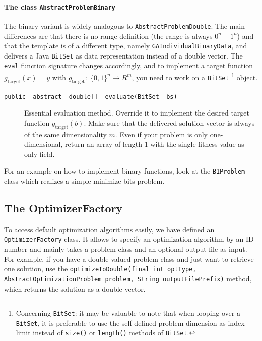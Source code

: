 \paragraph*{The class \texttt{AbstractProblemBinary}}

The binary variant is widely analogous to \texttt{AbstractProblemDouble}.
The main differences are that there is no range definition (the range
is always $0^{n}-1^{n}$) and that the template is of a different
type, namely \texttt{GAIndividualBinaryData}, and delivers a Java
\texttt{BitSet} as data representation instead of a double vector.
The \texttt{eval} function signature changes accordingly, and to implement
a target function $g_{\mathrm{target}}(x)=y$ with $g_{\mathrm{target}}:\;\{0,1\}^{n}\rightarrow R^{m}$,
you need to work on a \texttt{BitSet}%
\footnote{Concerning \texttt{BitSet}: it may be valuable to note that when looping
over a \texttt{BitSet}, it is preferable to use the self defined problem
dimension as index limit instead of \texttt{size()} or \texttt{length()}
methods of \texttt{BitSet}.%
} object.
%
\begin{description}
	\item [{\texttt{public ~abstract ~double{[}{]} ~evaluate(BitSet ~bs)}}] Essential
evaluation method. Override it to implement the desired target function
$g_{\mathrm{target}}(b)$. Make sure that the delivered solution vector
is always of the same dimensionality $m$. Even if your problem is
only one-dimensional, return an array of length 1 with the single
fitness value as only field.
\end{description}
%
For an example on how to implement binary functions, look at the \texttt{B1Problem}
class which realizes a simple minimize bits problem.


\subsection{The OptimizerFactory} \label{sub:The-OptimizerFactory}

To access default optimization algorithms easily, we have defined
an \texttt{OptimizerFactory} class. It allows to specify an optimization
algorithm by an ID number and mainly takes a problem class and an
optional output file as input. For example, if you have a double-valued
problem class and just want to retrieve one solution, use the \texttt{optimizeToDouble(final
int optType, AbstractOptimizationProblem problem, String outputFilePrefix)}
method, which returns the solution as a double vector. 

